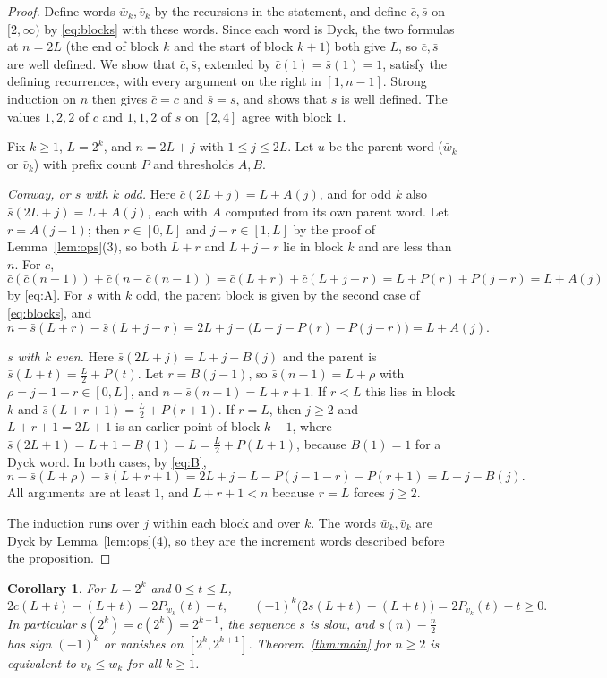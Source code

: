 \documentclass[11pt]{amsart}
\newtheorem{corollary}[proposition]{Corollary}
\theoremstyle{definition}
\theoremstyle{remark}
\numberwithin{equation}{section}
\begin{document}
\begin{proof}
Define words $\bar w_k,\bar v_k$ by the recursions in the statement, and define $\bar c,\bar s$ on $[2,\infty)$ by \eqref{eq:blocks} with these words. Since each word is Dyck, the two formulas at $n=2L$ (the end of block $k$ and the start of block $k+1$) both give $L$, so $\bar c,\bar s$ are well defined. We show that $\bar c,\bar s$, extended by $\bar c(1)=\bar s(1)=1$, satisfy the defining recurrences, with every argument on the right in $[1,n-1]$. Strong induction on $n$ then gives $\bar c=c$ and $\bar s=s$, and shows that $s$ is well defined. The values $1,2,2$ of $c$ and $1,1,2$ of $s$ on $[2,4]$ agree with block $1$.

Fix $k\ge1$, $L=2^k$, and $n=2L+j$ with $1\le j\le 2L$. Let $u$ be the parent word ($\bar w_k$ or $\bar v_k$) with prefix count $P$ and thresholds $A,B$.

\emph{Conway, or $s$ with $k$ odd.} Here $\bar c(2L+j)=L+A(j)$, and for odd $k$ also $\bar s(2L+j)=L+A(j)$, each with $A$ computed from its own parent word. Let $r=A(j-1)$; then $r\in[0,L]$ and $j-r\in[1,L]$ by the proof of Lemma~\ref{lem:ops}(3), so both $L+r$ and $L+j-r$ lie in block $k$ and are less than $n$. For $c$,
\[
\bar c(\bar c(n-1))+\bar c(n-\bar c(n-1))=\bar c(L+r)+\bar c(L+j-r)=L+P(r)+P(j-r)=L+A(j)
\]
by \eqref{eq:A}. For $s$ with $k$ odd, the parent block is given by the second case of \eqref{eq:blocks}, and
\[
n-\bar s(L+r)-\bar s(L+j-r)=2L+j-\bigl(L+j-P(r)-P(j-r)\bigr)=L+A(j).
\]

\emph{$s$ with $k$ even.} Here $\bar s(2L+j)=L+j-B(j)$ and the parent is $\bar s(L+t)=\frac L2+P(t)$. Let $r=B(j-1)$, so $\bar s(n-1)=L+\rho$ with $\rho=j-1-r\in[0,L]$, and $n-\bar s(n-1)=L+r+1$. If $r<L$ this lies in block $k$ and $\bar s(L+r+1)=\frac L2+P(r+1)$. If $r=L$, then $j\ge2$ and $L+r+1=2L+1$ is an earlier point of block $k+1$, where $\bar s(2L+1)=L+1-B(1)=L=\frac L2+P(L+1)$, because $B(1)=1$ for a Dyck word. In both cases, by \eqref{eq:B},
\[
n-\bar s(L+\rho)-\bar s(L+r+1)=2L+j-L-P(j-1-r)-P(r+1)=L+j-B(j).
\]
All arguments are at least $1$, and $L+r+1<n$ because $r=L$ forces $j\ge2$.

The induction runs over $j$ within each block and over $k$. The words $\bar w_k,\bar v_k$ are Dyck by Lemma~\ref{lem:ops}(4), so they are the increment words described before the proposition.
\end{proof}

\begin{corollary}\label{cor:heights}
For $L=2^k$ and $0\le t\le L$,
\[
2c(L+t)-(L+t)=2P_{w_k}(t)-t,\qquad (-1)^k\bigl(2s(L+t)-(L+t)\bigr)=2P_{v_k}(t)-t\ge0.
\]
In particular $s(2^k)=c(2^k)=2^{k-1}$, the sequence $s$ is slow, and $s(n)-\frac n2$ has sign $(-1)^k$ or vanishes on $[2^k,2^{k+1}]$. Theorem~\ref{thm:main} for $n\ge2$ is equivalent to $v_k\le w_k$ for all $k\ge1$.
\end{corollary}
\end{document}
